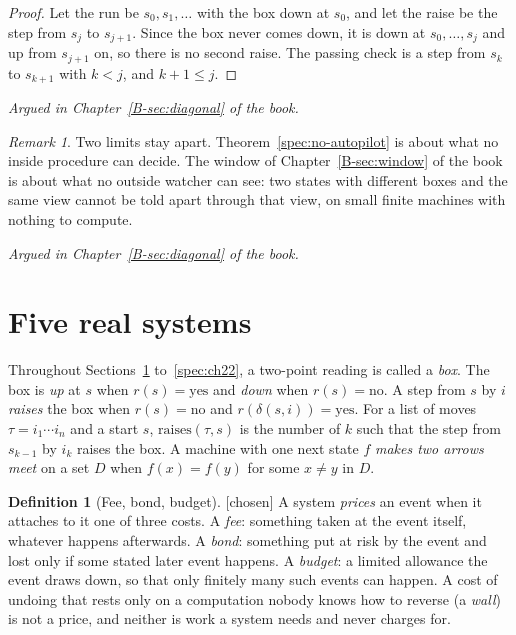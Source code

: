 \documentclass[11pt, a4paper]{article}
\theoremstyle{plain}
\theoremstyle{definition}
\newtheorem{definition}[theorem]{Definition}
\theoremstyle{remark}
\newtheorem{remark}[theorem]{Remark}
\newcommand{\step}{\delta}
\newcommand{\rd}{r}
\newcommand{\argued}[1]{\par\noindent\textit{Argued in Chapter~\ref{B-#1} of the book.}\par}
\newcommand{\kind}[1]{\textup{[#1]}}
\begin{document}
\begin{proof}
Let the run be $s_0,s_1,\dots$ with the box down at $s_0$, and let the raise be the step from $s_j$ to
$s_{j+1}$. Since the box never comes down, it is down at $s_0,\dots,s_j$ and up from $s_{j+1}$ on, so there is no
second raise. The passing check is a step from $s_k$ to $s_{k+1}$ with $k<j$, and $k+1\le j$.
\end{proof}

\argued{sec:diagonal}

\begin{remark}
Two limits stay apart. Theorem~\ref{spec:no-autopilot} is about what no inside procedure can decide. The window
of Chapter~\ref{B-sec:window} of the book is about what no outside watcher can see: two states with different
boxes and the same view cannot be told apart through that view, on small finite machines with nothing to
compute.
\end{remark}

\argued{sec:diagonal}
\section{Five real systems}\label{spec:ch18}

Throughout Sections~\ref{spec:ch18} to~\ref{spec:ch22}, a two-point reading is called a \emph{box}. The box
is \emph{up} at $s$ when $\rd(s)=\mathrm{yes}$ and \emph{down} when $\rd(s)=\mathrm{no}$. A step from $s$ by
$i$ \emph{raises} the box when $\rd(s)=\mathrm{no}$ and $\rd(\step(s,i))=\mathrm{yes}$. For a list of moves
$\tau=i_1\cdots i_n$ and a start $s$, $\mathrm{raises}(\tau,s)$ is the number of $k$ such that the step from
$s_{k-1}$ by $i_k$ raises the box. A machine with one next state $f$ \emph{makes two arrows meet} on a set
$D$ when $f(x)=f(y)$ for some $x\ne y$ in $D$.

\begin{definition}[Fee, bond, budget]\label{spec:fee-bond-budget} \kind{chosen}
A system \emph{prices} an event when it attaches to it one of three costs. A \emph{fee}: something taken at
the event itself, whatever happens afterwards. A \emph{bond}: something put at risk by the event and lost only
if some stated later event happens. A \emph{budget}: a limited allowance the event draws down, so that only
finitely many such events can happen. A cost of undoing that rests only on a computation nobody knows how to
reverse (a \emph{wall}) is not a price, and neither is work a system needs and never charges for.
\end{definition}
\end{document}
